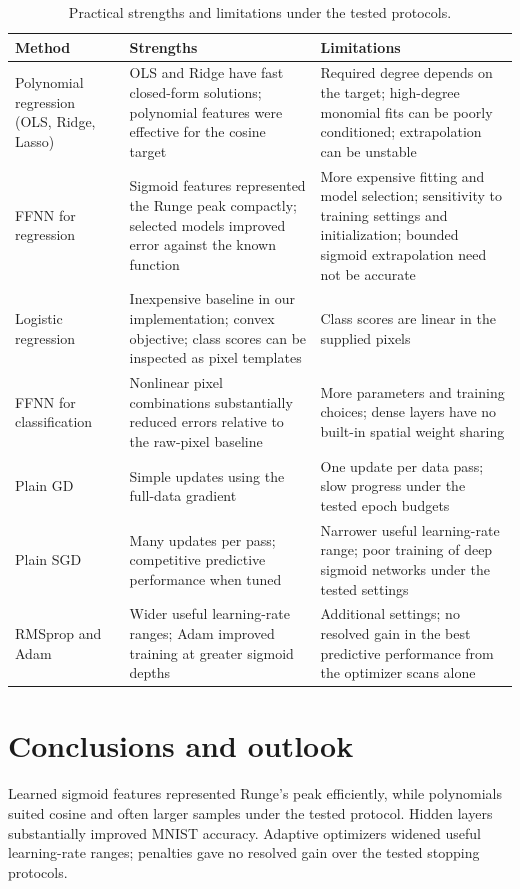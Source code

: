 \documentclass[aps,prb,reprint,superscriptaddress,nofootinbib,longbibliography,floatfix]{revtex4-2}
\begin{document}
\begin{table}[!tbp]
\small
\centering
\caption{Practical strengths and limitations under the tested protocols.}\label{tab:evaluation}
\renewcommand{\arraystretch}{1.15}
\begin{ruledtabular}
\begin{tabular}{@{}p{}p{}p{}@{}}
Method & Strengths & Limitations \\ \hline
Polynomial regression (OLS, Ridge, Lasso) & OLS and Ridge have fast closed-form solutions; polynomial features were effective for the cosine target & Required degree depends on the target; high-degree monomial fits can be poorly conditioned; extrapolation can be unstable \\
FFNN for regression & Sigmoid features represented the Runge peak compactly; selected models improved error against the known function & More expensive fitting and model selection; sensitivity to training settings and initialization; bounded sigmoid extrapolation need not be accurate \\
Logistic regression & Inexpensive baseline in our implementation; convex objective; class scores can be inspected as pixel templates & Class scores are linear in the supplied pixels \\
FFNN for classification & Nonlinear pixel combinations substantially reduced errors relative to the raw-pixel baseline & More parameters and training choices; dense layers have no built-in spatial weight sharing \\
Plain GD & Simple updates using the full-data gradient & One update per data pass; slow progress under the tested epoch budgets \\
Plain SGD & Many updates per pass; competitive predictive performance when tuned & Narrower useful learning-rate range; poor training of deep sigmoid networks under the tested settings \\
RMSprop and Adam & Wider useful learning-rate ranges; Adam improved training at greater sigmoid depths & Additional settings; no resolved gain in the best predictive performance from the optimizer scans alone \\
\end{tabular}
\end{ruledtabular}
\end{table}

\section{Conclusions and outlook}\label{sec:conclusion}
Learned sigmoid features represented Runge's peak efficiently, while polynomials suited cosine and often larger samples under the tested protocol. Hidden layers substantially improved MNIST accuracy. Adaptive optimizers widened useful learning-rate ranges; penalties gave no resolved gain over the tested stopping protocols.
\end{document}
